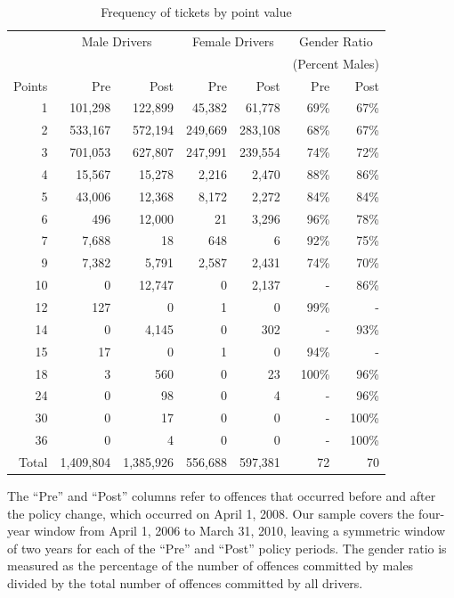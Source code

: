 \documentclass{cje}
\begin{document}
\begin{table}%
\centering
\begin{tabular}{r r r r r r r}
  \hline
		& \multicolumn{2}{c}{Male Drivers} 	&  \multicolumn{2}{c}{Female Drivers} &  \multicolumn{2}{c}{Gender Ratio} \\
 & & & & & \multicolumn{2}{c}{(Percent Males)} \\

 \cmidrule(lr){2-3}\cmidrule(lr){4-5}\cmidrule(lr){6-7} 
Points 	& Pre 		& Post		& Pre 		& Post		& Pre 		& Post		\\ 
  \hline
1 		& 101,298 	& 122,899	&  45,382 	&   61,778 	& 69\% 	& 67\% \\ 
2 		& 533,167 	& 572,194	& 249,669 	& 283,108 	& 68\% 	& 67\% \\ 
3 		& 701,053 	& 627,807	& 247,991	& 239,554	& 74\% 	& 72\% \\ 
4 		&  15,567 	&  15,278 	&    2,216 	&    2,470 	& 88\% 	& 86\% \\ 
5 		&  43,006 	&  12,368 	&    8,172 	&    2,272 	& 84\% 	& 84\% \\ 
6 		&     496 	&  12,000 	&        21 	&    3,296 	& 96\% 	& 78\% \\ 
7 		&   7,688 	&        18 	&      648 	&          6 	& 92\% 	& 75\% \\ 
9 		&   7,382 	&    5,791 	&    2,587 	&    2,431 	& 74\% 	& 70\% \\ 
10 		&         0 	&  12,747 	&         0 	&    2,137 	& -			& 86\% \\ 
12 		&     127	&         0 	&         1 	&         0 	& 99\% 	& - \\ 
14 		&       0 	&   4,145 	&         0 	&      302 	& -			& 93\% \\ 
15 		&      17 	&         0 	&         1 	&         0 	& 94\% 	& - \\ 
18 		&       3 	&      560 	&         0 	&        23 	& 100\% 	& 96\% \\ 
24 		&       0 	&       98 	&         0 	&         4 	& -			& 96\% \\ 
30 		&       0 	&       17 	&         0 	&         0 	& -			& 100\% \\ 
36 		&       0 	&        4 	&         0 	&         0 	& -			& 100\% \\ 

   \hline

Total 	  & 1,409,804 & 1,385,926 & 556,688 & 597,381 & 72 & 70 \\ 

   \hline
\end{tabular}
\caption{Frequency of tickets by point value} 
The ``Pre'' and ``Post'' columns refer to offences that occurred before and after the policy change, which occurred on April 1, 2008. 
Our sample covers the four-year window from April 1, 2006 to March 31, 2010, 
leaving a symmetric window of two years for each of the ``Pre'' and ``Post'' policy periods.
The gender ratio is measured as the percentage of the number of offences committed by males 
divided by the total number of offences committed by all drivers. 
\label{tab:point_freq}
\end{table}
\end{document}
